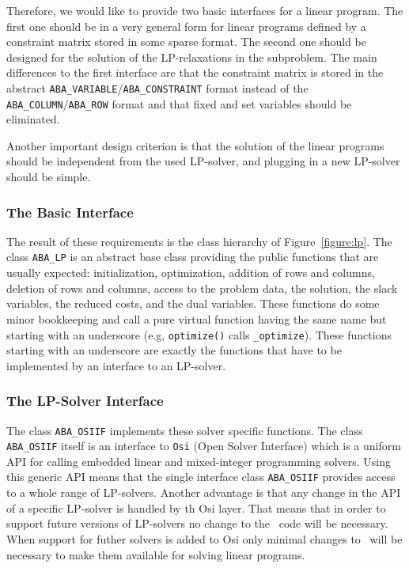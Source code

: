 Therefore, we would like to provide two basic interfaces for a linear
program. The first one should be in a very general form for linear
programs defined by a constraint matrix stored in some sparse format.
The second one should be designed for the solution of the LP-relaxations
in the subproblem. The main differences to the first interface
are that the constraint matrix
is stored in the abstract {\tt ABA\_VARIABLE}/{\tt ABA\_CONSTRAINT} format
instead of the {\tt ABA\_COLUMN}/{\tt ABA\_ROW} format
and that fixed and set variables should be eliminated.

Another important design criterion is that the solution of the linear
programs should be independent from the used LP-solver, and plugging
in a new LP-solver should be simple.


\subsubsection{The Basic Interface}

The result of these requirements is the class hierarchy of
Figure~\ref{figure:lp}. The class {\tt ABA\_LP} 
is an abstract base class 
providing the public functions that are usually expected:
initialization, optimization, addition of rows and columns,
deletion of rows and columns, access to the problem data,
the solution, the slack variables, the reduced costs, and the dual
variables. These functions do some minor bookkeeping and call
a pure virtual function having the same name but starting with
an underscore (e.g, {\tt optimize()} calls 
{\tt \_optimize}). These functions starting with an underscore
are exactly the functions that have to be implemented by an 
interface to an LP-solver.

\subsubsection{The LP-Solver Interface}

The class {\tt ABA\_OSIIF} 
implements these solver specific functions.
The class {\tt ABA\_OSIIF} itself is an interface to {\tt Osi}
 (Open Solver Interface) 
which is a uniform API for calling embedded 
linear and mixed-integer programming solvers. Using this generic API
means that the single interface class {\tt ABA\_OSIIF} provides access
to a whole range of LP-solvers. Another advantage is that any change
in the API of a specific LP-solver is handled by th Osi layer. 
That means that in order to support future versions of LP-solvers no 
change to the \ABACUS\ code will be necessary. When support for futher 
solvers is added to Osi only minimal changes to \ABACUS\ will be 
necessary to make them available for solving linear programs. 

